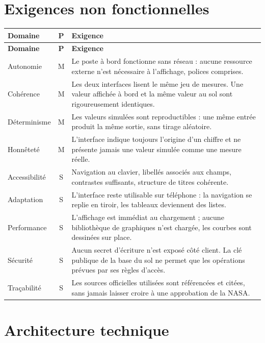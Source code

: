 \documentclass[11pt,a4paper]{article}
\let\sectionorig\section
\renewcommand{\section}{\Needspace{5\baselineskip}\sectionorig}
\begin{document}
\section{Exigences non fonctionnelles}

\begin{longtable}{@{}L{2.9cm} c L{11.1cm}@{}}
\toprule
\textbf{Domaine} & \textbf{P} & \textbf{Exigence} \\
\midrule
\endfirsthead
\toprule
\textbf{Domaine} & \textbf{P} & \textbf{Exigence} \\
\midrule
\endhead
\bottomrule
\endfoot
Autonomie & M & Le poste \`a bord fonctionne sans r\'eseau : aucune ressource externe n'est n\'ecessaire \`a l'affichage, polices comprises. \\
Coh\'erence & M & Les deux interfaces lisent le m\^eme jeu de mesures. Une valeur affich\'ee \`a bord et la m\^eme valeur au sol sont rigoureusement identiques. \\
D\'eterminisme & M & Les valeurs simul\'ees sont reproductibles : une m\^eme entr\'ee produit la m\^eme sortie, sans tirage al\'eatoire. \\
Honn\^etet\'e & M & L'interface indique toujours l'origine d'un chiffre et ne pr\'esente jamais une valeur simul\'ee comme une mesure r\'eelle. \\
Accessibilit\'e & S & Navigation au clavier, libell\'es associ\'es aux champs, contrastes suffisants, structure de titres coh\'erente. \\
Adaptation & S & L'interface reste utilisable sur t\'el\'ephone : la navigation se replie en tiroir, les tableaux deviennent des listes. \\
Performance & S & L'affichage est imm\'ediat au chargement ; aucune biblioth\`eque de graphiques n'est charg\'ee, les courbes sont dessin\'ees sur place. \\
S\'ecurit\'e & S & Aucun secret d'\'ecriture n'est expos\'e c\^ot\'e client. La cl\'e publique de la base du sol ne permet que les op\'erations pr\'evues par ses r\`egles d'acc\`es. \\
Tra\c{c}abilit\'e & S & Les sources officielles utilis\'ees sont r\'ef\'erenc\'ees et cit\'ees, sans jamais laisser croire \`a une approbation de la NASA. \\
\end{longtable}
\section{Architecture technique}
\end{document}
